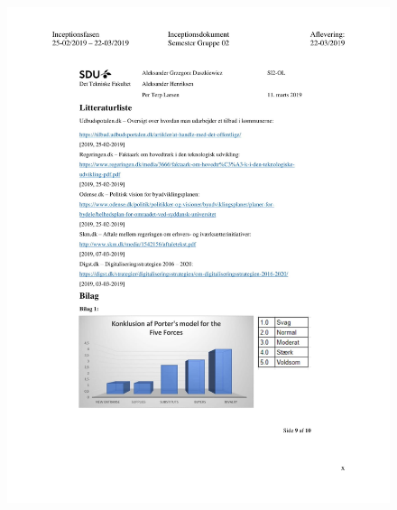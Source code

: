 \begin{figure}[hb]
  \includegraphics[scale = 0.33]{./PNG/Inceptions/Gruppe 02 + InceptionsDokument-43.jpg} 
\end{figure}


